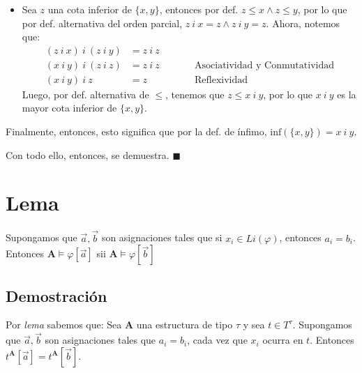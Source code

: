 \documentclass{article}
\begin{document}
\begin{itemize}
\begin{itemize}
          \item Sea $z$ una cota inferior de $\{x,y\}$, entonces por def. $z\leq x\land z\leq y$, por lo que por def. alternativa del orden parcial, $z\ i\ x=z\land z\ i\ y=z$. Ahora, notemos que:
                \begin{equation*}
                  \begin{alignedat}{2}
                    (z\ i\ x)\ i\ (z\ i\ y) & =z\ i\ z                                                  \\
                    (x\ i\ y)\ i\ (z\ i\ z) & =z\ i\ z &  & \qquad\text{Asociatividad y Conmutatividad} \\
                    (x\ i\ y)\ i\ z         & =z       &  & \qquad\text{Reflexividad}
                  \end{alignedat}
                \end{equation*}
                Luego, por def. alternativa de $\leq$, tenemos que $z\leq x\ i\ y$, por lo que $x\ i\ y$ es la mayor cota inferior de $\{x,y\}$.
        \end{itemize}
        Finalmente, entonces, esto significa que por la def. de ínfimo, $\text{inf}(\{x,y\})=x\ i\ y$.
\end{itemize}

Con todo ello, entonces, se demuestra. $\blacksquare$

\section*{Lema}
Supongamos que $\vec{a},\vec{b}$ son asignaciones tales que si $x_i\in Li(\varphi)$, entonces $a_i=b_i$. Entonces $\mathbf{A}\vDash\varphi[\vec{a}]$ sii $\mathbf{A}\vDash\varphi[\vec{b}]$
\subsection*{Demostración}
Por \textit{lema} sabemos que: Sea $\mathbf{A}$ una estructura de tipo $\tau$ y sea $t\in T^\tau$. Supongamos que $\vec{a},\vec{b}$ son asignaciones tales que $a_i=b_i$, cada vez que $x_i$ ocurra en $t$. Entonces $t^\mathbf{A}[\vec{a}]=t^\mathbf{A}[\vec{b}]$.
\end{document}
